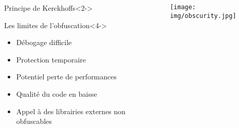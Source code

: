 \documentclass[aspectratio=1610]{beamer}%
\begin{document}
  \begin{frame}
    \begin{columns}
      \begin{column}{0.48\linewidth}
        \begin{block}{Principe de Kerckhoffs}<2->
          \centering
        \end{block}
        \begin{block}{Les limites de l'obfuscation}<4->
          \begin{itemize}
          \item<5-> Débogage difficile
          \item<6-> Protection temporaire
          \item<7-> Potentiel perte de performances
          \item<8-> Qualité du code en baisse
          \item<9-> Appel à des librairies externes non obfuscables
          \end{itemize}
        \end{block}
      \end{column}
      \begin{column}{0.48\linewidth}
        \texttt{[image: img/obscurity.jpg]}
      \end{column}
    \end{columns}

    \end{frame}
\end{document}
